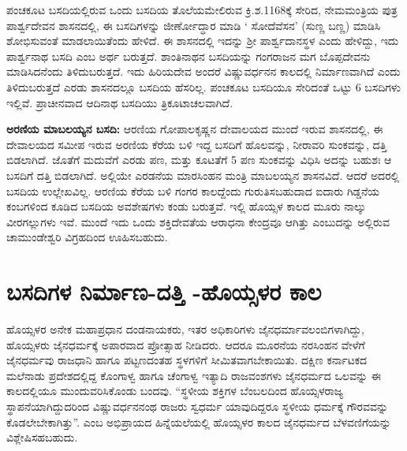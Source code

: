 ಪಂಚಕೂಟ ಬಸದಿಯಲ್ಲಿರುವ ಒಂದು ಬಸದಿಯ ತೊಲೆಯಮೇಲಿರುವ ಕ್ರಿ.ಶ.1168ಕ್ಕೆ ಸೇರಿದ, ನೇಮಮಂತ್ರಿಯ ಪುತ್ರ ಪಾರ್ಶ್ವದೇವನ ಶಾಸನದಲ್ಲಿ, ಈ ಬಸದಿಗಳನ್ನು ಜೀರ್ಣೋದ್ಧಾರ ಮಾಡಿ ` ಸೋದೆವೆಸನ' (ಸುಣ್ಣ ಬಣ್ಣ) ಮಾಡಿಸಿ ಶೋಭಿಸುವಂತೆ ಮಾಡಲಾಯಿತೆಂದು ಹೇಳಿದೆ. ಈ ಶಾಸನದಲ್ಲಿ ಇದನ್ನು ಶ‍್ರೀ ಪಾರ್ಶ್ವದಾನಸ್ಥಳ ಎಂದು ಹೇಳಿದ್ದು, ಇದು ಪಾರ್ಶ್ವನಾಥ ಬಸದಿ ಎಂಬ ಅರ್ಥ ಬರುತ್ತದೆ. ಶಾಂತಿನಾಥನ ಬಸದಿಯನ್ನು ಗಂಗರಾಜನ ಮಗ ಬೊಪ್ಪದೇವನು ಮಾಡಿಸಿದನೆಂದು ತಿಳಿದುಬರುತ್ತದೆ. ಇದು ಹಿರಿಯದೇವ ಅಂದರೆ ವಿಷ್ಣುವರ್ಧನನ ಕಾಲದಲ್ಲಿ ನಿರ್ಮಾಣವಾಗಿದೆ ಎಂದು ತಿಳಿದುಬರುತ್ತದೆ ಎರಡು ಶಾಸನದಲ್ಲೂ ಬಸದಿಯ ಹೆಸರಿಲ್ಲ. ಪಂಚಕೂಟ ಬಸದಿಯೂ ಸೇರಿದಂತೆ ಒಟ್ಟು 6 ಬಸದಿಗಳು ಇಲ್ಲಿವೆ. ಪ್ರಾಚೀನವಾದ ಆದಿನಾಥ ಬಸದಿಯು ತ್ರಿಕೂಟಾಚಲವಾಗಿದೆ.

\textbf{ಅರಣಿಯ ಮಾಬಲಯ್ಯನ ಬಸದಿ:} ಆರಣಿಯ ಗೋಪಾಲಕೃಷ್ಣನ ದೇವಾಲಯದ ಮುಂದೆ ಇರುವ ಶಾಸನದಲ್ಲಿ, ಈ ದೇವಾಲಯದ ಸಮೀಪ ಇರುವ ಅರಣಿಯ ಕೆರೆಯ ಬಳಿ ಇದ್ದ ಬಸದಿಗೆ ಹೊಲವನ್ನು, ನೀರಾವರಿ ಸುಂಕವನ್ನು, ದತ್ತಿ ಬಿಡಲಾಗಿದೆ. ಜೊತೆಗೆ ಮದುವೆಗೆ ಎರಡು ಪಣ, ಮತ್ತು ಕೂಟತೆಗೆ 5 ಪಣ ಸುಂಕವನ್ನು ವಿಧಿಸಿ ಅದನ್ನು ಬಹುಶಃ ಆ ಬಸದಿಗೆ ದತ್ತಿ ಬಿಡಲಾಗಿದೆ. ಅಲ್ಲಿಯೇ ಎರಡನೆಯ ಮಾರಸಿಂಹನ ಮಂತ್ರಿ ಮಾಬಲಯ್ಯನ ಶಾಸನವಿದೆ. ಆದರೆ ಅದರಲ್ಲಿ ಬಸದಿಯ ಉಲ್ಲೇಖವಿಲ್ಲ. ಆರಣಿಯ ಕೆರೆಯ ಬಳಿ ಗಂಗರ ಕಾಲದ್ದೆಂದು ಗುರುತಿಸಬಹುದಾದ ಐದಾರು ಗಿಡ್ಡನೆಯ ಕಂಬ\-ಗಳಿಂದ ಕೂಡಿದ ಬಸದಿಯ ಅವಶೇಷಗಳು ಕಂಡು ಬರುತ್ತವೆ. ಇಲ್ಲಿ ಹೊಯ್ಸಳ ಕಾಲದ ಮೂರು ನಾಲ್ಕು ವೀರಗಲ್ಲುಗಳು ಇವೆ. ಮುಂದೆ ಇದು ಒಂದು ಶಕ್ತಿದೇವತೆಯ ಆರಾಧನಾ ಕೇಂದ್ರವೂ ಆಗಿತ್ತು ಎಂಬುದನ್ನು ಅಲ್ಲಿರುವ ಚಾಮುಂಡೇಶ್ವರಿ ವಿಗ್ರಹದಿಂದ ಊಹಿಸಬಹುದು.


\section*{ಬಸದಿಗಳ ನಿರ್ಮಾಣ-ದತ್ತಿ -ಹೊಯ್ಸಳರ ಕಾಲ}

ಹೊಯ್ಸಳರ ಅನೇಕ ಮಹಾಪ್ರಧಾನ ದಂಡನಾಯಕರು, ಇತರ ಅಧಿಕಾರಿಗಳು ಜೈನಧರ್ಮಾವಲಂಬಿಗಳಾಗಿದ್ದು, ಹೊಯ್ಸಳರು ಜೈನಧರ್ಮಕ್ಕೆ ಅಪಾರವಾದ ಪ್ರೋತ್ಸಾಹ ನೀಡಿದರು. ಆದರೂ ಮೂರನೆಯ ನರಸಿಂಹನ ವೇಳೆಗೆ ಜೈನಧರ್ಮವು ರಾಜಧಾನಿ ಹಾಗೂ ಪಟ್ಟಣದಂತಹ ಸ್ಥಳಗಳಿಗೆ ಸೀಮಿತವಾಗಬೇಕಾಯಿತು. ದಕ್ಷಿಣ ಕರ್ನಾಟಕದ ಮಲೆನಾಡು ಪ್ರದೇಶದಲ್ಲಿದ್ದ ಕೊಂಗಾಳ್ವ ಹಾಗೂ ಚೆಂಗಾಳ್ವ ಇತ್ಯಾದಿ ರಾಜವಂಶಗಳು ಜೈನಧರ್ಮದ ಒಲವನ್ನು ಈ ಕಾಲದಲ್ಲಿಯೂ ಮುಂದುವರಿಸಿಕೊಂಡು ಬಂದವು. “ಸ್ಥಳೀಯ ಶಕ್ತಿಗಳ ಬೆಂಬಲದಿಂದ ಹೊಯ್ಸಳರಾಜ್ಯ ಸ್ಥಾಪನೆಯಾಗಿದ್ದುದರಿಂದ ವಿಷ್ಣುವರ್ಧನನಂಥ ರಾಜರು ಸ್ವಧರ್ಮ ಯಾವುದಿದ್ದರೂ ಸ್ಥಳೀಯ ಧರ್ಮಕ್ಕೆ ಗೌರವವನ್ನು ಕೊಡಲೇಬೇಕಾಗಿತ್ತು”. ಎಂಬ ಅಭಿಪ್ರಾಯದ ಹಿನ್ನೆಯಲೆಯಲ್ಲಿ ಹೊಯ್ಸಳರ ಕಾಲದ ಜೈನಧರ್ಮದ ಬೆಳವಣಿಗೆಯನ್ನು ವಿಶ್ಲೇಷಿಸಹಬಹುದು.

